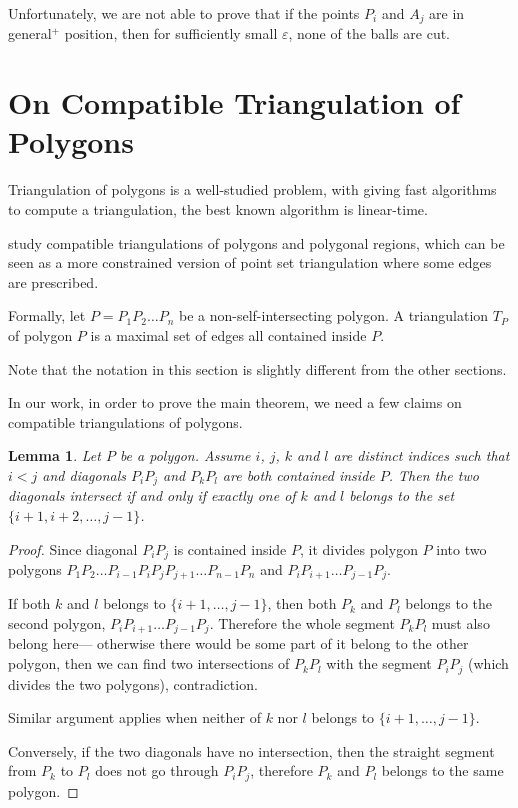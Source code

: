 \documentclass{article}
\theoremstyle{plain}
\newtheorem{lemma}         {Lemma}      [section]
\begin{document}
Unfortunately, we are not able to prove that if the points
$P_i$ and $A_j$ are in general$^+$ position, then for sufficiently small $\varepsilon$,
none of the balls are cut.

\section{On Compatible Triangulation of Polygons}

Triangulation of polygons is a well-studied problem,
with \cite{Garey1978,Chazelle1991} giving fast algorithms to compute a triangulation,
the best known algorithm is linear-time.

\cite{Lubiw_2020,Gupta_1997,Aronov_1993} study compatible triangulations
of polygons and polygonal regions, which can be seen as a more constrained version of
point set triangulation where some edges are prescribed.

Formally, let $P = P_1 P_2 \dots P_n$ be a non-self-intersecting polygon.
A triangulation $T_P$ of polygon $P$ is a maximal set of edges all contained inside $P$.

Note that the notation in this section is slightly different from the other sections.

In our work, in order to prove the main theorem, we need a few claims on compatible triangulations of polygons.

\begin{lemma}
	\label{lemma:vertex_ordering}
	Let $P$ be a polygon.
	Assume $i$, $j$, $k$ and $l$ are distinct indices
	such that $i<j$ and diagonals $P_i P_j$ and $P_k P_l$ are both contained inside $P$.
	Then the two diagonals intersect
	if and only if exactly one of $k$ and $l$ belongs to the set $\{ i+1, i+2, \dots, j-1 \}$.
\end{lemma}
\begin{proof}
	Since diagonal $P_i P_j$ is contained inside $P$,
	it divides polygon $P$ into two polygons
	$P_1 P_2 \dots P_{i-1} P_i P_j P_{j+1} \dots P_{n-1} P_n$
	and
	$P_i P_{i+1} \dots P_{j-1} P_j$.

	If both $k$ and $l$ belongs to $\{ i+1, \dots, j-1 \}$,
	then both $P_k$ and $P_l$ belongs to the second polygon,
	$P_i P_{i+1} \dots P_{j-1} P_j$.
	Therefore the whole segment $P_k P_l$ must also belong here---%
	otherwise there would be some part of it belong to the other polygon,
	then we can find two intersections of $P_k P_l$ with the segment $P_i P_j$
	(which divides the two polygons), contradiction.

	Similar argument applies when neither of $k$ nor $l$ belongs to $\{ i+1, \dots, j-1 \}$.

	Conversely, if the two diagonals have no intersection, then the straight segment from $P_k$ to $P_l$
	does not go through $P_i P_j$, therefore $P_k$ and $P_l$ belongs to the same polygon.
\end{proof}
\end{document}
